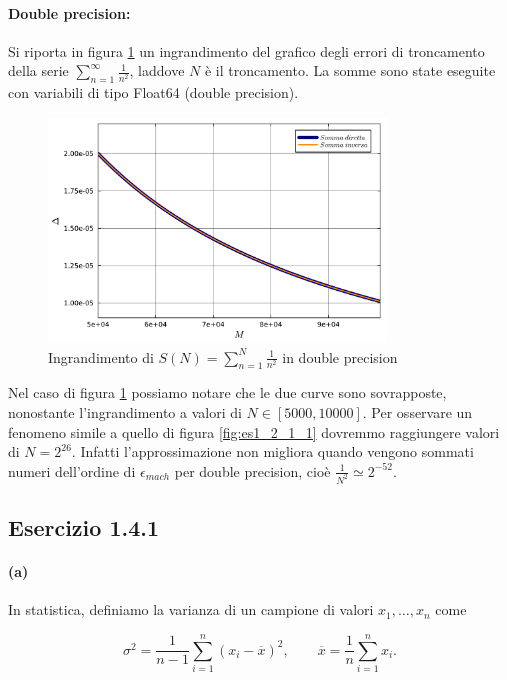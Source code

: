\documentclass[letterpaper, 12pt]{article}
\begin{document}
\paragraph{Double precision:}

Si riporta in figura \ref{fig:es1_2_1_2} un ingrandimento del grafico degli errori di troncamento della serie 
$\sum_{n=1}^\infty \frac{1}{n^2}$, laddove $N$ è il troncamento. La somme sono state eseguite
con variabili di tipo Float64 (double precision).

\begin{figure}[!ht]
    \centering
    \includegraphics[width=0.8\textwidth]{1212.pdf}
    \caption{Ingrandimento di $S(N)=\sum_{n=1}^N \frac{1}{n^2}$ in double precision}
    \label{fig:es1_2_1_2}
\end{figure}

Nel caso di figura \ref{fig:es1_2_1_2} possiamo notare che le due curve sono sovrapposte, nonostante l'ingrandimento a 
valori di $N \in [5000, 10000]$. Per osservare un fenomeno simile a quello di 
figura \ref{fig:es1_2_1_1} dovremmo raggiungere valori di $N = 2^{26}$. Infatti l'approssimazione non migliora
quando vengono sommati numeri dell'ordine di $\epsilon_{mach}$ per double precision, cioè
 $\frac{1}{N^2} \simeq 2^{-52}$.

\subsection{Esercizio 1.4.1}
\paragraph{(a)} In statistica, definiamo la varianza di un campione di valori $x_1,\ldots,x_n$ come

\begin{equation}
    \sigma^2 = \frac{1}{n-1} \sum_{i=1}^n (x_i - \overline{x})^2,
    \qquad 
    \overline{x} = \frac{1}{n} \sum_{i=1}^n x_i.
    \label{eq:varianza_naive}
\end{equation}
\end{document}
